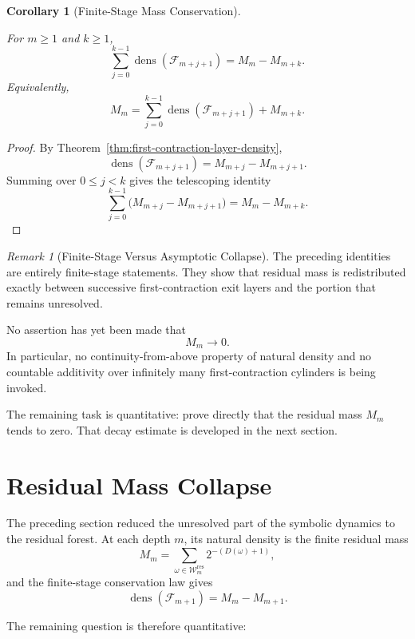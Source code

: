\documentclass[12pt, oneside]{article}
\numberwithin{equation}{section}
\theoremstyle{definition}
\theoremstyle{plain}
\newtheorem{corollary}[theorem]{Corollary}
\theoremstyle{remark}
\newtheorem*{remark}{Remark}
\begin{document}
\begin{corollary}[Finite-Stage Mass Conservation]
\label{cor:finite-stage-mass-conservation}

For \(m\ge1\) and \(k\ge1\),
\[
\boxed{
\sum_{j=0}^{k-1}
\operatorname{dens}(\mathcal F_{m+j+1})
=
M_m-M_{m+k}.
}
\]
Equivalently,
\[
M_m
=
\sum_{j=0}^{k-1}
\operatorname{dens}(\mathcal F_{m+j+1})
+
M_{m+k}.
\]
\end{corollary}

\begin{proof}
By Theorem~\ref{thm:first-contraction-layer-density},
\[
\operatorname{dens}(\mathcal F_{m+j+1})
=
M_{m+j}-M_{m+j+1}.
\]
Summing over \(0\le j<k\) gives the telescoping identity
\[
\sum_{j=0}^{k-1}
\bigl(M_{m+j}-M_{m+j+1}\bigr)
=
M_m-M_{m+k}.
\]
\end{proof}

\begin{remark}[Finite-Stage Versus Asymptotic Collapse]
The preceding identities are entirely finite-stage statements. They show
that residual mass is redistributed exactly between successive
first-contraction exit layers and the portion that remains unresolved.

No assertion has yet been made that
\[
M_m\longrightarrow0.
\]
In particular, no continuity-from-above property of natural density and no
countable additivity over infinitely many first-contraction cylinders is
being invoked.

The remaining task is quantitative: prove directly that the residual mass
\(M_m\) tends to zero. That decay estimate is developed in the next section.
\end{remark}


\section{Residual Mass Collapse}
\label{sec:residual-mass-collapse}

The preceding section reduced the unresolved part of the symbolic dynamics
to the residual forest. At each depth \(m\), its natural density is the
finite residual mass
\[
M_m
=
\sum_{\omega\in\mathcal W_m^{\mathrm{res}}}
2^{-(D(\omega)+1)},
\]
and the finite-stage conservation law gives
\[
\operatorname{dens}(\mathcal F_{m+1})
=
M_m-M_{m+1}.
\]

The remaining question is therefore quantitative:
\end{document}
